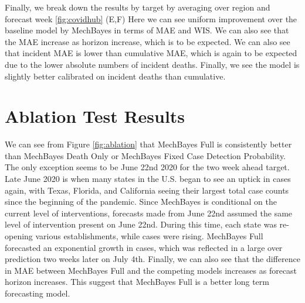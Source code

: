 \documentclass[11pt]{amsart}
\begin{document}
Finally, we break down the results by target by averaging over region and forecast week  \ref{fig:covidhub} (E,F) Here we can see uniform improvement over the baseline model by MechBayes in terms of MAE and WIS. We can also see that the MAE increase as horizon increase, which is to be expected. We can also see that incident MAE is lower than cumulative MAE, which is again to be expected due to the lower absolute numbers of incident deaths. Finally, we see the model is slightly better calibrated on incident deaths than cumulative.
%
%   
   
   
   \section{Ablation Test Results}

We can see from Figure \ref{fig:ablation} that MechBayes Full is consistently better than MechBayes Death Only or MechBayes Fixed Case Detection Probability. The only exception seems to be June 22nd 2020 for the two week ahead target. Late June 2020 is when many states in the U.S. began to see an uptick in cases again, with Texas, Florida, and California seeing their largest total case counts since the beginning of the pandemic. Since MechBayes is conditional on the current level of interventions, forecasts made from June 22nd assumed the same level of intervention present on June 22nd. During this time, each state was re-opening various establishments, while cases were rising. MechBayes Full forecasted an exponential growth in cases, which was reflected in a large over prediction two weeks later on July 4th. Finally, we can also see that the difference in MAE between MechBayes Full and the competing models increases as forecast horizon increases. This suggest that MechBayes Full is a better long term forecasting model.
\end{document}
